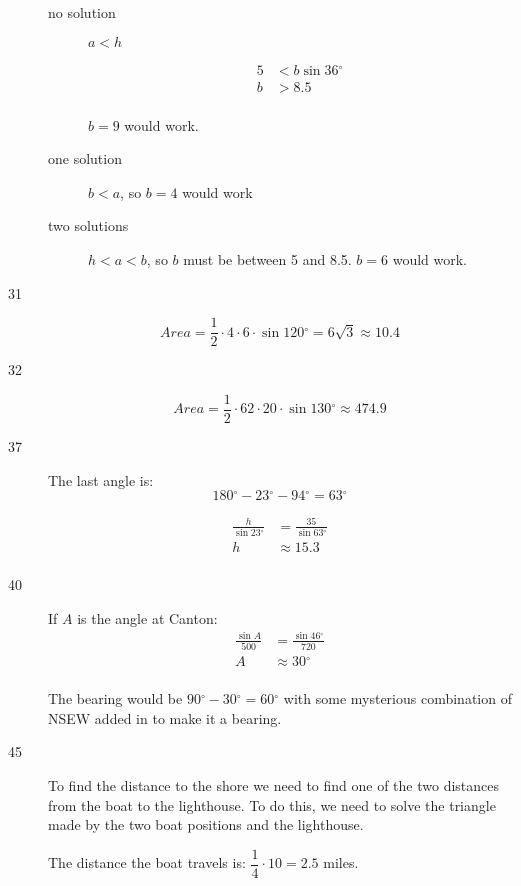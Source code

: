 \documentclass[fleqn,addpoints]{exam}
\newcommand{\degree}{\ensuremath{^\circ}}
\begin{document}
\begin{description}
\begin{description}
\item[no solution]
$a < h$

\begin{align*}
  5 &< b \sin 36 \degree \\
  b &> 8.5 \\
\end{align*}

$b = 9$ would work.

\item[one solution]
$b < a$, so $b = 4$ would work

\item[two solutions]
$h < a < b$, so $b$ must be between 5 and 8.5.  $b = 6$ would work.

\end{description}

\item[31]
\[
  Area = \frac{1}{2} \cdot 4 \cdot 6 \cdot \sin 120 \degree = 6 \sqrt{3} \approx 10.4
\]

\item[32]
\[
  Area = \frac{1}{2} \cdot 62 \cdot 20 \cdot \sin 130 \degree \approx 474.9
\]

\item[37]
The last angle is:
\[
  180 \degree - 23 \degree - 94 \degree = 63 \degree
\]

\begin{align*}
  \frac{h}{\sin 23 \degree} &= \frac{35}{\sin 63 \degree} \\
  h &\approx 15.3 \\
\end{align*}

\item[40]
If $A$ is the angle at Canton:
\begin{align*}
  \frac{\sin A}{500} &= \frac{\sin 46 \degree}{720} \\
  A &\approx 30 \degree \\
\end{align*}

The bearing would be $90 \degree - 30 \degree = 60 \degree$ with some mysterious combination of NSEW added in to make it a bearing.

\item[45]
To find the distance to the shore we need to find one of the two distances from the boat to the lighthouse.  To do
this, we need to solve the triangle made by the two boat positions and the lighthouse.

The distance the boat travels is: $\dfrac{1}{4} \cdot 10 = 2.5$ miles.


\end{description}
\end{document}
